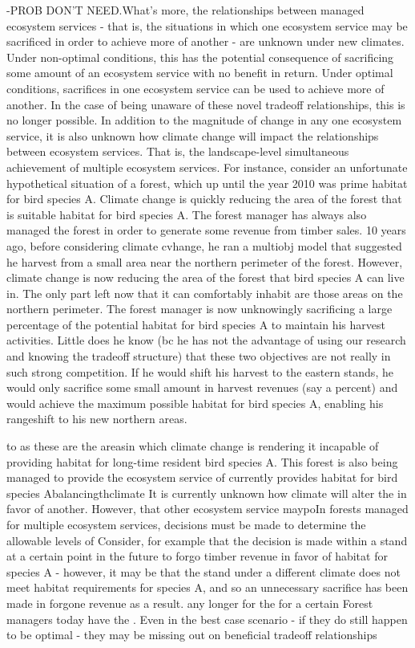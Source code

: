 -PROB DON'T NEED.What's more, the relationships between managed ecosystem services - that is, the situations in which one ecosystem service may be sacrificed in order to achieve more of another - are unknown under new climates. Under non-optimal conditions, this has the potential consequence of sacrificing some amount of an ecosystem service with no benefit in return. Under optimal conditions, sacrifices in one ecosystem service can be used to achieve more of another. In the case of being unaware of these novel tradeoff relationships, this is no longer possible.
In addition to the magnitude of change in any one ecosystem service, it is also unknown how climate change will impact the relationships between ecosystem services. That is, the landscape-level simultaneous achievement of multiple ecosystem services.
For instance, consider an unfortunate hypothetical situation of a forest, which up until the year 2010 was prime habitat for bird species A. Climate change is quickly reducing the area of the forest that is suitable habitat for bird species A. The forest manager has always also managed the forest in order to generate some revenue from timber sales. 10 years ago, before considering climate cvhange, he ran a multiobj model that suggested he harvest from a small area near the northern perimeter of the forest. However, climate change is now reducing the area of the forest that bird species A can live in. The only part left now that it can comfortably inhabit are those areas on the northern perimeter. The forest manager is now unknowingly sacrificing a large percentage of the potential habitat for bird species A to maintain his harvest activities. Little does he know (bc he has not the advantage of using our research and knowing the tradeoff structure) that these two objectives are not really in such strong competition. If he would shift his harvest to the eastern stands, he would only sacrifice some small amount in harvest revenues (say a percent) and would achieve the maximum possible habitat for bird species A, enabling his rangeshift to his new northern areas.

 to as these are the areasin which climate change is rendering it incapable of providing habitat for long-time resident bird species A. This forest is also being managed to provide the ecosystem service of  currently provides habitat for bird species Abalancingthclimate It is currently unknown how climate will alter the 
in favor of another. However, that other ecosystem service maypoIn forests managed for multiple ecosystem services, decisions must be made to determine the allowable levels of 
Consider, for example that the decision is made within a stand at a certain point in the future to forgo timber revenue in favor of habitat for species A - however, it may be that the stand under a different climate does not meet habitat requirements for species A, and so an unnecessary sacrifice has been made in forgone revenue as a result. any longer for the for a certain Forest managers today have the . Even in the best case scenario - if they do still happen to be optimal - they may be missing out on beneficial tradeoff relationships

